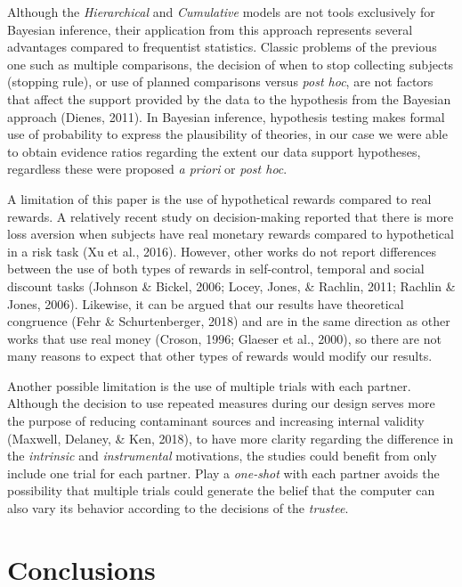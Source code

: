 \documentclass[12pt,]{article}
\begin{document}
Although the \emph{Hierarchical} and \emph{Cumulative} models are not
tools exclusively for Bayesian inference, their application from this
approach represents several advantages compared to frequentist
statistics. Classic problems of the previous one such as multiple
comparisons, the decision of when to stop collecting subjects (stopping
rule), or use of planned comparisons versus \emph{post hoc}, are not
factors that affect the support provided by the data to the hypothesis
from the Bayesian approach (Dienes, 2011). In Bayesian inference,
hypothesis testing makes formal use of probability to express the
plausibility of theories, in our case we were able to obtain evidence
ratios regarding the extent our data support hypotheses, regardless
these were proposed \emph{a priori} or \emph{post hoc}.

A limitation of this paper is the use of hypothetical rewards compared
to real rewards. A relatively recent study on decision-making reported
that there is more loss aversion when subjects have real monetary
rewards compared to hypothetical in a risk task (Xu et al., 2016).
However, other works do not report differences between the use of both
types of rewards in self-control, temporal and social discount tasks
(Johnson \& Bickel, 2006; Locey, Jones, \& Rachlin, 2011; Rachlin \&
Jones, 2006). Likewise, it can be argued that our results have
theoretical congruence (Fehr \& Schurtenberger, 2018) and are in the
same direction as other works that use real money (Croson, 1996; Glaeser
et al., 2000), so there are not many reasons to expect that other types
of rewards would modify our results.

Another possible limitation is the use of multiple trials with each
partner. Although the decision to use repeated measures during our
design serves more the purpose of reducing contaminant sources and
increasing internal validity (Maxwell, Delaney, \& Ken, 2018), to have
more clarity regarding the difference in the \emph{intrinsic} and
\emph{instrumental} motivations, the studies could benefit from only
include one trial for each partner. Play a \emph{one-shot} with each
partner avoids the possibility that multiple trials could generate the
belief that the computer can also vary its behavior according to the
decisions of the \emph{trustee}.

\hypertarget{conclusions}{%
\section{Conclusions}\label{conclusions}}
\end{document}
